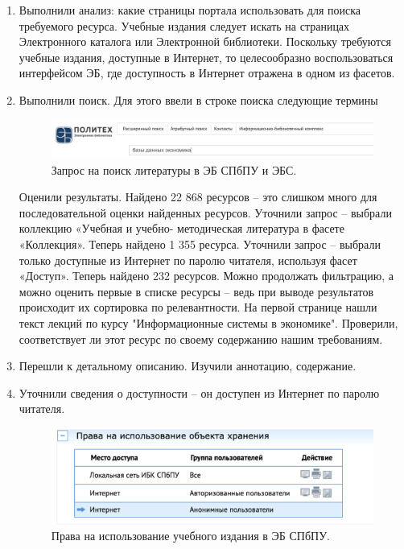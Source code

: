 \documentclass[14pt,a4paper,report]{report}
\begin{document}
\begin{enumerate}
\item Выполнили анализ: какие страницы портала использовать для поиска требуемого ресурса. Учебные издания следует искать на страницах Электронного каталога или Электронной библиотеки. Поскольку требуются учебные издания, доступные в Интернет, то целесообразно воспользоваться интерфейсом ЭБ, где доступность в Интернет отражена в одном из фасетов.
\item Выполнили поиск. Для этого ввели в строке поиска следующие термины

\begin{figure}[h!]
\centering
\includegraphics[scale = 0.33]{133.png}
\caption{Запрос на поиск литературы в ЭБ СПбПУ и ЭБС.}
\label{image:1}
\end{figure}

Оценили результаты. Найдено 22 868 ресурсов – это слишком много для последовательной оценки найденных ресурсов. Уточнили запрос – выбрали коллекцию «Учебная и учебно- методическая литература в фасете «Коллекция». Теперь найдено 1 355 ресурса. Уточнили запрос – выбрали только доступные из Интернет по паролю читателя, используя фасет «Доступ». Теперь найдено 232 ресурсов. Можно продолжать фильтрацию, а можно оценить первые в списке ресурсы – ведь при выводе результатов происходит их сортировка по релевантности. На первой странице нашли текст лекций по курсу "Информационные системы в экономике". Проверили, соответствует ли этот ресурс по своему содержанию нашим требованиям.

\clearpage

\item Перешли к детальному описанию. Изучили аннотацию, содержание.
\item Уточнили сведения о доступности – он доступен из Интернет по паролю читателя.

\begin{figure}[h!]
\centering
\includegraphics[scale = 0.33]{134.png}
\caption{Права на использование учебного издания в ЭБ СПбПУ.}
\label{image:1}
\end{figure}

\end{enumerate}
\end{document}
